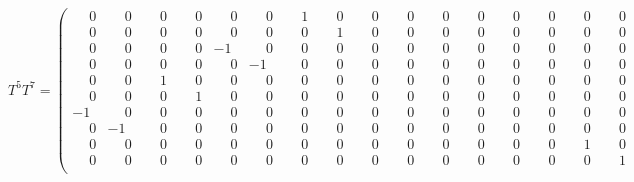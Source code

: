 \documentclass[10pt]{article}
\begin{document}
\[
T^{5}T^{7} = \left(\begin{smallmatrix}
\phantom{-}0 & \phantom{-}0 & \phantom{-}0 & \phantom{-}0 & \phantom{-}0 & \phantom{-}0 & \phantom{-}1 & \phantom{-}0 & \phantom{-}0 & \phantom{-}0 & \phantom{-}0 & \phantom{-}0 & \phantom{-}0 & \phantom{-}0 & \phantom{-}0 & \phantom{-}0 \\
\phantom{-}0 & \phantom{-}0 & \phantom{-}0 & \phantom{-}0 & \phantom{-}0 & \phantom{-}0 & \phantom{-}0 & \phantom{-}1 & \phantom{-}0 & \phantom{-}0 & \phantom{-}0 & \phantom{-}0 & \phantom{-}0 & \phantom{-}0 & \phantom{-}0 & \phantom{-}0 \\
\phantom{-}0 & \phantom{-}0 & \phantom{-}0 & \phantom{-}0 & -1 & \phantom{-}0 & \phantom{-}0 & \phantom{-}0 & \phantom{-}0 & \phantom{-}0 & \phantom{-}0 & \phantom{-}0 & \phantom{-}0 & \phantom{-}0 & \phantom{-}0 & \phantom{-}0 \\
\phantom{-}0 & \phantom{-}0 & \phantom{-}0 & \phantom{-}0 & \phantom{-}0 & -1 & \phantom{-}0 & \phantom{-}0 & \phantom{-}0 & \phantom{-}0 & \phantom{-}0 & \phantom{-}0 & \phantom{-}0 & \phantom{-}0 & \phantom{-}0 & \phantom{-}0 \\
\phantom{-}0 & \phantom{-}0 & \phantom{-}1 & \phantom{-}0 & \phantom{-}0 & \phantom{-}0 & \phantom{-}0 & \phantom{-}0 & \phantom{-}0 & \phantom{-}0 & \phantom{-}0 & \phantom{-}0 & \phantom{-}0 & \phantom{-}0 & \phantom{-}0 & \phantom{-}0 \\
\phantom{-}0 & \phantom{-}0 & \phantom{-}0 & \phantom{-}1 & \phantom{-}0 & \phantom{-}0 & \phantom{-}0 & \phantom{-}0 & \phantom{-}0 & \phantom{-}0 & \phantom{-}0 & \phantom{-}0 & \phantom{-}0 & \phantom{-}0 & \phantom{-}0 & \phantom{-}0 \\
-1 & \phantom{-}0 & \phantom{-}0 & \phantom{-}0 & \phantom{-}0 & \phantom{-}0 & \phantom{-}0 & \phantom{-}0 & \phantom{-}0 & \phantom{-}0 & \phantom{-}0 & \phantom{-}0 & \phantom{-}0 & \phantom{-}0 & \phantom{-}0 & \phantom{-}0 \\
\phantom{-}0 & -1 & \phantom{-}0 & \phantom{-}0 & \phantom{-}0 & \phantom{-}0 & \phantom{-}0 & \phantom{-}0 & \phantom{-}0 & \phantom{-}0 & \phantom{-}0 & \phantom{-}0 & \phantom{-}0 & \phantom{-}0 & \phantom{-}0 & \phantom{-}0 \\
\phantom{-}0 & \phantom{-}0 & \phantom{-}0 & \phantom{-}0 & \phantom{-}0 & \phantom{-}0 & \phantom{-}0 & \phantom{-}0 & \phantom{-}0 & \phantom{-}0 & \phantom{-}0 & \phantom{-}0 & \phantom{-}0 & \phantom{-}0 & \phantom{-}1 & \phantom{-}0 \\
\phantom{-}0 & \phantom{-}0 & \phantom{-}0 & \phantom{-}0 & \phantom{-}0 & \phantom{-}0 & \phantom{-}0 & \phantom{-}0 & \phantom{-}0 & \phantom{-}0 & \phantom{-}0 & \phantom{-}0 & \phantom{-}0 & \phantom{-}0 & \phantom{-}0 & \phantom{-}1 \\

\end{smallmatrix}\]
\end{document}
